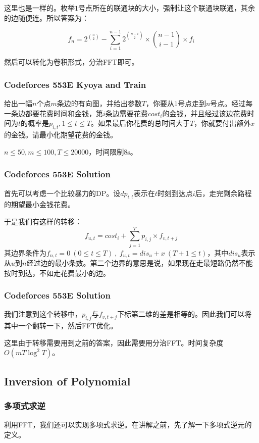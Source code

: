 \documentclass[10pt]{beamer}
\begin{document}
\begin{spacing}{1.2}
\begin{frame}
			这里也是一样的。枚举$1$号点所在的联通块的大小，强制让这个联通块联通，其余的边随便连。所以答案为： \pause

			$$f_n=2^{\binom{n}{2}} - \sum_{i=1}^{n-1} 2^{\binom{n-i}{2}} \times \binom{n-1}{i-1} \times f_i$$ \pause

			然后可以转化为卷积形式，分治FFT即可。

		\end{frame}
		\begin{frame}
			\frametitle{Codeforces 553E Kyoya and Train}
			
			给出一幅$n$个点$m$条边的有向图，并给出参数$T$，你要从$1$号点走到$n$号点。经过每一条边都要花费时间和金钱，第$i$条边需要花费$cost_i$的金钱，并且经过该边花费时间为$t$的概率是$p_{i,t},1 \le t \le T$。如果最后你花费的总时间大于$T$，你就要付出额外$x$的金钱。请最小化期望花费的金钱。 \pause

			$n \le 50,m \le 100,T \le 20000$，时间限制8s。

		\end{frame}
		\begin{frame}
			\frametitle{Codeforces 553E Solution}

			首先可以考虑一个比较暴力的DP。设$dp_{i,t}$表示在$t$时刻到达点$i$后，走完剩余路程的期望最小金钱花费。 \pause

			于是我们有这样的转移：
			$$f_{u,t}=cost_i + \sum_{j=1}^{T} p_{i,j} \times f_{v,t+j}$$ \pause
			其边界条件为$f_{n,t}=0 \ (0 \le t \le T) \ , \ f_{u,t}=dis_{u}+x \ (T+1 \le t)$，其中$dis_u$表示从$u$到$n$经过边的最小条数。第二个边界的意思是说，如果现在走最短路仍然不能按时到达，不如走花费最小的边。

		\end{frame}
		\begin{frame}
			\frametitle{Codeforces 553E Solution}

			我们注意到这个转移中，$p_{i,j}$与$f_{v,t+j}$下标第二维的差是相等的。因此我们可以将其中一个翻转一下，然后FFT优化。\pause

			这里由于转移需要用到之前的答案，因此需要用分治FFT。时间复杂度$O(mT \log^2 T)$。

		\end{frame}

		\subsection{Inversion of Polynomial}
		\begin{frame}
			\frametitle{多项式求逆}

			利用FFT，我们还可以实现多项式求逆。在讲解之前，先了解一下多项式逆元的定义。 \pause


\end{frame}
\end{spacing}
\end{document}
